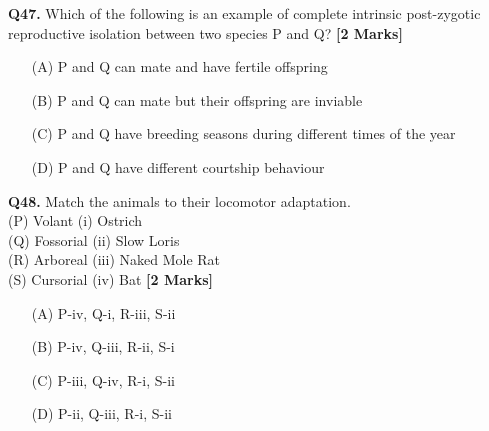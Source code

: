 \documentclass[11pt]{article}
\newcommand{\questionb}[2]{
    \noindent\textbf{Q#2.} #1 \hfill \textbf{[2 Marks]}
}
\begin{document}
\questionb{Which of the following is an example of complete intrinsic post-zygotic reproductive isolation between two species P and Q?}{47}
\begin{enumerate}
    \item[(A)] P and Q can mate and have fertile offspring
    \item[(B)] P and Q can mate but their offspring are inviable
    \item[(C)] P and Q have breeding seasons during different times of the year
    \item[(D)] P and Q have different courtship behaviour
\end{enumerate}
\vspace{0.5cm}

\questionb{Match the animals to their locomotor adaptation.\\
(P) Volant \hspace{2cm} (i) Ostrich\\
(Q) Fossorial \hspace{1.6cm} (ii) Slow Loris\\
(R) Arboreal \hspace{1.5cm} (iii) Naked Mole Rat\\
(S) Cursorial \hspace{1.5cm} (iv) Bat}{48}
\begin{enumerate}
    \item[(A)] P-iv, Q-i, R-iii, S-ii
    \item[(B)] P-iv, Q-iii, R-ii, S-i
    \item[(C)] P-iii, Q-iv, R-i, S-ii
    \item[(D)] P-ii, Q-iii, R-i, S-ii
\end{enumerate}
\vspace{0.5cm}
\end{document}
